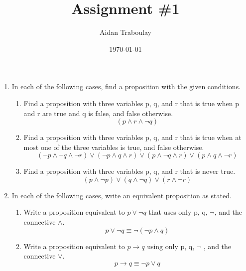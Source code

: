 \documentclass[12pt]{article}
\title{Assignment \#1}
\author{Aidan Traboulay}
\date{\today}
\begin{document}
\maketitle
\begin{enumerate}[leftmargin=\labelsep]
\item In each of the following cases, find a proposition with the given conditions.
    \begin{enumerate}
    \item Find a proposition with three variables p, q, and r that is true when p and r are true and q is false, and false otherwise.
    \begin{equation*}
        \left(p \wedge r \wedge \lnot q \right)
    \end{equation*}
    \item Find a proposition with three variables p, q, and r that is true when at most one of the three variables is true, and false otherwise.
    \begin{equation*}
        \left(\lnot p \wedge \lnot q \wedge \lnot r \right) \vee \left(\lnot p \wedge q \wedge r\right) \vee \left(p \wedge \lnot q \wedge r \right) \vee \left(p \wedge q \wedge \lnot r\right)
    \end{equation*}

    \item Find a proposition with three variables p, q, and r that is never true.
        \begin{equation*}
            \left(p \wedge \lnot p\right) \vee \left(q \wedge \lnot q\right) \vee \left(r \wedge \lnot r\right)
        \end{equation*}
    \end{enumerate}

\item In each of the following cases, write an equivalent proposition as stated.
    \begin{enumerate}
    \item Write a proposition equivalent to $ p \vee \lnot q $ that uses only p, q, $\lnot$, and the connective $\wedge$.
    \begin{equation*}
        p \vee \lnot q \equiv \lnot \left(\lnot p \wedge q\right)
    \end{equation*}
    \item Write a proposition equivalent to $ p \to q $ using only p, q, $ \lnot $ , and the connective $\vee.$
    \begin{equation*}
        p \to q \equiv \lnot p \vee q
    \end{equation*}
    \end{enumerate}
    

\end{enumerate}
\end{document}
